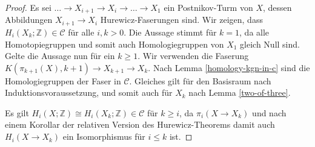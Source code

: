 \documentclass[11pt, a4paper, german]{article}
\theoremstyle{definition}
\theoremstyle{remark}
\newcommand{\Z}{\mathbb{Z}} %
\newcommand{\SC}{\mathcal{C}} %
\begin{document}
\begin{proof}
  Es sei $\ldots \to X_{i+1} \to X_i \to \ldots \to X_1$ ein Postnikov-Turm von $X$, dessen Abbildungen $X_{i+1} \to X_i$ Hurewicz-Faserungen sind.
  Wir zeigen, dass $H_i(X_k; \Z) \in \SC$ für alle $i, k > 0$.
  Die Aussage stimmt für $k = 1$, da alle Homotopiegruppen und somit auch Homologiegruppen von $X_1$ gleich Null sind.
  Gelte die Aussage nun für ein $k \geq 1$.
  Wir verwenden die Faserung $K(\pi_{k+1}(X), k{+}1) \to X_{k+1} \to X_k$.
  Nach Lemma \ref{homology-kgn-in-c} sind die Homologiegruppen der Faser in $\SC$.
  Gleiches gilt für den Basisraum nach Induktionsvoraussetzung,
  und somit auch für $X_k$ nach Lemma \ref{two-of-three}.

  Es gilt $H_i(X; \Z) \cong H_i(X_k; \Z) \in \SC$ für $k \geq i$, da $\pi_i(X \to X_k)$ und nach einem Korollar der relativen Version des Hurewicz-Theorems damit auch $H_i(X \to X_k)$ ein Isomorphismus für $i \leq k$ ist.
\end{proof}
\end{document}
